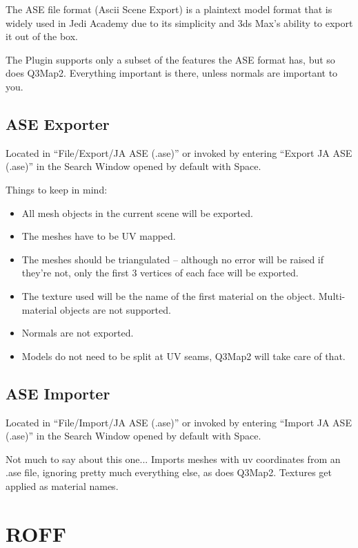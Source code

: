 \documentclass[a4paper,10pt]{article}
\begin{document}
 The ASE file format (Ascii Scene Export) is a plaintext model format that is widely used in Jedi Academy due
 to its simplicity and 3ds Max's ability to export it out of the box.
 
 The Plugin supports only a subset of the features the ASE format has, but so does Q3Map2. Everything important
 is there, unless normals are important to you.
 
 \subsection{ASE Exporter}
 
 Located in ``File/Export/JA ASE (.ase)'' or invoked by entering ``Export JA ASE (.ase)'' in the Search Window
 opened by default with Space.
 
 Things to keep in mind:
 \begin{itemize}
  \item All mesh objects in the current scene will be exported.
  \item The meshes have to be UV mapped.
  \item The meshes should be triangulated -- although no error will be raised if they're not, only the first
  3 vertices of each face will be exported.
  \item The texture used will be the name of the first material on the object. Multi-material objects are not
  supported.
  \item Normals are not exported.
  \item Models do not need to be split at UV seams, Q3Map2 will take care of that.
 \end{itemize}
 
 \subsection{ASE Importer}
 
 Located in ``File/Import/JA ASE (.ase)'' or invoked by entering ``Import JA ASE (.ase)'' in the Search Window
 opened by default with Space.
 
 Not much to say about this one... Imports meshes with uv coordinates from an .ase file, ignoring pretty much
 everything else, as does Q3Map2. Textures get applied as material names.
 
 \section{ROFF}
 
\end{document}
